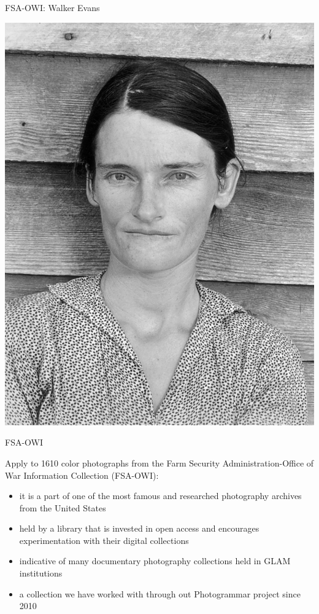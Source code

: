\documentclass[12pt,ignorenonframetext,aspectratio=169]{beamer}
\begin{document}
\begin{frame}{FSA-OWI: Walker Evans}

\begin{center}
\includegraphics[height=0.8\textheight]{img/Allie_Mae_Burroughs_print.jpg}
\end{center}

\end{frame}

\begin{frame}{FSA-OWI}

Apply to 1610 color photographs from the Farm Security Administration-Office of War
Information Collection (FSA-OWI):

\begin{itemize}
\item it is a part of one of the most famous and researched photography archives from the United States  \pause
\item held by a library that is invested in open access and
encourages experimentation with their digital collections  \pause
\item indicative of many documentary photography collections held in GLAM
institutions  \pause
\item a collection we have worked with through out Photogrammar project since 2010
\end{itemize}

\end{frame}
\end{document}
